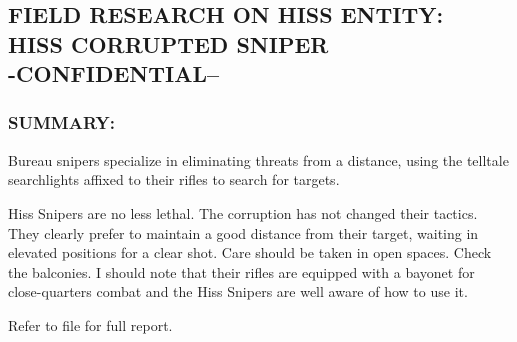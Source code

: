 \subsection*{FIELD RESEARCH ON HISS ENTITY:\\
	HISS CORRUPTED SNIPER\\
	-CONFIDENTIAL--}
\subsubsection*{SUMMARY:}
\par Bureau snipers specialize in eliminating
threats from a distance, using the telltale
searchlights affixed to their rifles to
search for targets.
\par Hiss Snipers are no less lethal. The
corruption has not changed their tactics. They clearly prefer to
maintain a good distance from their target, waiting in elevated
positions for a clear shot. Care should be taken in open spaces.
Check the balconies. I should note that their rifles are equipped
with a bayonet for close-quarters combat and the Hiss Snipers
are well aware of how to use it.
\par Refer to file  for full report.